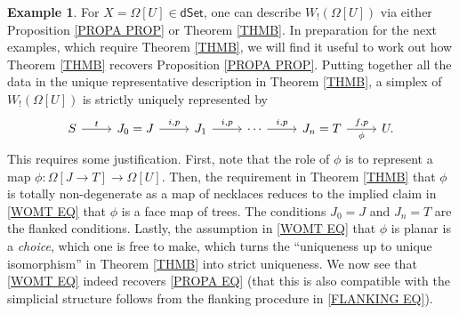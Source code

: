 \documentclass[a4paper,10pt
,draft
]{article}%
\numberwithin{equation}{section}
\numberwithin{figure}{section}
\theoremstyle{definition} %
\newtheorem{example}[equation]{Example}%
\newcommand{\1}{\ensuremath{\mathbbm 1}}%
\begin{document}
\begin{example}\label{WREP_EX}
	For $X=\Omega[U]\in \mathsf{dSet}$,
	one can describe $W_!(\Omega[U])$
	via either Proposition \ref{PROPA PROP} or Theorem \ref{THMB}.
	In preparation for the next examples, 
	which require Theorem \ref{THMB},
	we will find it useful to work out how 
	Theorem \ref{THMB} recovers Proposition \ref{PROPA PROP}. 
	Putting together all the data in the unique representative description
	in Theorem \ref{THMB},
	a simplex of $W_!(\Omega[U])$ is strictly uniquely represented by
\begin{equation}\label{WOMT EQ}
\begin{tikzcd}
	S \ar{r}{t} &
	J_0 = J \ar{r}{i,p} &
	J_1 \ar{r}{i,p} &
	\cdots \ar{r}{i,p} &
	J_n = T \ar{r}{f,p}[swap]{\phi} &
	U.
\end{tikzcd}
\end{equation}
This requires some justification. 
First, note that the role of $\phi$ is to represent a map
$\phi \colon \Omega[J\to T] \to \Omega[U]$. 
Then, the requirement in Theorem \ref{THMB} that $\phi$ is totally non-degenerate 
as a map of necklaces reduces to the implied claim in 
\eqref{WOMT EQ} that $\phi$ is a face map of trees.
The conditions $J_0 =J$ and $J_n = T$ are the flanked conditions.
Lastly, the assumption in \eqref{WOMT EQ}
that $\phi$ is planar is a \emph{choice}, 
which one is free to make, which turns the 
``uniqueness up to unique isomorphism''
in Theorem \ref{THMB} into strict uniqueness.
We now see that \eqref{WOMT EQ} indeed recovers \eqref{PROPA EQ}
(that this is also compatible with the simplicial structure follows from the flanking procedure in \eqref{FLANKING EQ}).


\end{example}
\end{document}
